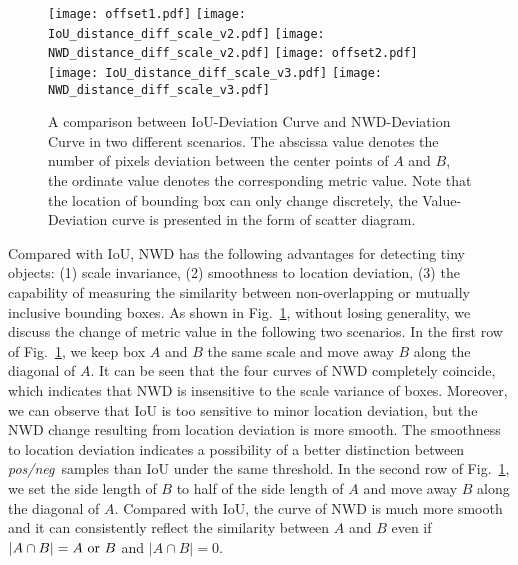 \documentclass{article}
\newcommand{\fixedvskip}{-3mm}
\newcommand{\posneg}{\textit{pos/neg}~}
\begin{document}
 \begin{figure}[t]
    \centering
    \subfigure
    {
        \label{fig:offset1}
        \texttt{[image: offset1.pdf]}
    }
    \subfigure
    {
        \label{fig:iou1}
        \texttt{[image: IoU\_distance\_diff\_scale\_v2.pdf]}
    }
    \subfigure
    {
        \label{fig:nwd1}
        \texttt{[image: NWD\_distance\_diff\_scale\_v2.pdf]}
    }
    \subfigure
    {
        \label{fig:offset2}
        \texttt{[image: offset2.pdf]}
    }
    \subfigure
    {
        \label{fig:iou2}
        \texttt{[image: IoU\_distance\_diff\_scale\_v3.pdf]}
    }
    \subfigure
    {
        \label{fig:nwd2}
        \texttt{[image: NWD\_distance\_diff\_scale\_v3.pdf]}
    }
    \vspace{\fixedvskip}
    \caption{A comparison between IoU-Deviation Curve and NWD-Deviation Curve in two different scenarios. The abscissa value denotes the number of pixels deviation between the center points of $A$ and $B$, the ordinate value denotes the corresponding metric value. Note that the location of bounding box can only change discretely, the Value-Deviation curve is presented in the form of scatter diagram. }
    \label{fig::deviation_analysis}
    \vspace{\fixedvskip}
\end{figure}

Compared with IoU, NWD has the following advantages for detecting tiny objects: (1) scale invariance, (2) smoothness to location deviation, (3) the capability of measuring the similarity between non-overlapping or mutually inclusive bounding boxes. As shown in Fig.~\ref{fig::deviation_analysis}, without losing generality, we discuss the change of metric value in the following two scenarios. In the first row of Fig.~\ref{fig::deviation_analysis}, we keep box $A$ and $B$ the same scale and move away $B$ along the diagonal of $A$. It can be seen that the four curves of NWD completely coincide, which indicates that NWD is insensitive to the scale variance of boxes. Moreover, we can observe that IoU is too sensitive to minor location deviation, but the NWD change resulting from location deviation is more smooth. The smoothness to location deviation indicates a possibility of a better distinction between \posneg samples than IoU under the same threshold. In the second row of Fig.~\ref{fig::deviation_analysis}, we set the side length of $B$ to half of the side length of $A$ and move away $B$ along the diagonal of $A$. Compared with IoU, the curve of NWD is much more smooth and it can consistently reflect the similarity between $A$ and $B$ even if $|A\cap B| = A~{\rm or}~B$ and $|A\cap B| = 0$. 
\end{document}
